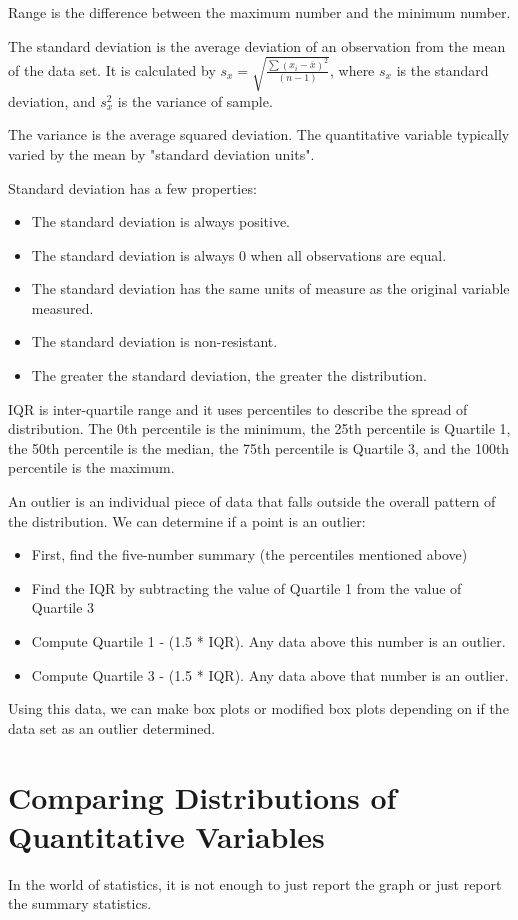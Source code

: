 \documentclass[../stats.tex]{subfiles}
\begin{document}
Range is the difference between the maximum number and the minimum number.

The standard deviation is the average deviation of an observation from the mean of the data set. It is calculated by $s_x=\sqrt{\frac{\sum{(x_i-\bar{x})^2}}{(n-1)}}$, where $s_x$ is the standard deviation, and $s_x^2$ is the variance of sample.

The variance is the average squared deviation. The quantitative variable typically varied by the mean by "standard deviation units".

Standard deviation has a few properties:
\begin{itemize}
    \item The standard deviation is always positive.
    \item The standard deviation is always 0 when all observations are equal.
    \item The standard deviation has the same units of measure as the original variable measured.
    \item The standard deviation is non-resistant.
    \item The greater the standard deviation, the greater the distribution.
\end{itemize}
IQR is inter-quartile range and it uses percentiles to describe the spread of distribution. The 0th percentile is the minimum, the 25th percentile is Quartile 1, the 50th percentile is the median, the 75th percentile is Quartile 3, and the 100th percentile is the maximum.

An outlier is an individual piece of data that falls outside the overall pattern of the distribution. We can determine if a point is an outlier:
\begin{itemize}
    \item First, find the five-number summary (the percentiles mentioned above)
    \item Find the IQR by subtracting the value of Quartile 1 from the value of Quartile 3
    \item Compute Quartile 1 - (1.5 * IQR). Any data above this number is an outlier.
    \item Compute Quartile 3 - (1.5 * IQR). Any data above that number is an outlier. 
\end{itemize}
Using this data, we can make box plots or modified box plots depending on if the data set as an outlier determined.
\section{Comparing Distributions of Quantitative Variables}
In the world of statistics, it is not enough to just report the graph or just report the summary statistics.
\end{document}

